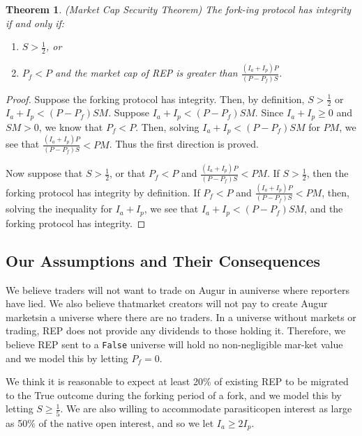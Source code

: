 \documentclass[12pt,floatfix,reprint,nofootinbib,amsmath,amssymb,epsfig,pre,floats,letterpaper,groupedaffiliation]{revtex4-1}
\newtheorem{theorem}{Theorem}
\theoremstyle{definition}
\theoremstyle{definition}
\begin{document}
\begin{theorem}\label{th:market_cap_security_theorem}
(Market Cap Security Theorem) The fork-\linebreak ing protocol has integrity if and only if:
\begin{enumerate}
\item $S > \frac{1}{2}$, or
\item $P_f < P$ and the market cap of REP is greater than $\frac{(I_a + I_p)P}{(P - P_f)S}$.
\end{enumerate}
\end{theorem}

\begin{proof}
Suppose the forking protocol has integrity. Then, by definition, $S > \frac{1}{2}$ or $I_a + I_p < (P - P_f)SM$. Suppose $I_a + I_p < (P - P_f)SM$. Since $I_a + I_p \geq 0$ and $SM > 0$, we know that $P_f < P$. Then, solving $I_a + I_p < (P - P_f)SM$ for $PM$, we see that $\frac{(I_a + I_p)P}{(P - P_f)S} < PM$. Thus the first direction is proved.

Now suppose that $S > \frac{1}{2}$, or that $P_f < P$ and $\frac{(I_a + I_p)P}{(P - P_f)S} < PM$. If $S > \frac{1}{2}$, then the forking protocol has integrity by definition. If $P_f < P$ and $\frac{(I_a + I_p)P}{(P - P_f)S} < PM$, then, solving the inequality for $I_a + I_p$, we see that $I_a + I_p < (P-P_f) SM$, and the forking protocol has integrity.
\end{proof}

\subsection{Our Assumptions and Their Consequences}

We believe traders will not want to trade on Augur in a\linebreak universe where reporters have lied. We also believe that\linebreak market creators will not pay to create Augur markets\linebreak in a universe where there are no traders. In a universe without markets or trading, REP does not provide any dividends to those holding it. Therefore, we believe REP sent to a \texttt{False} universe will hold no non-negligible mar-\linebreak ket value and we model this by letting $P_f = 0$.

We think it is reasonable to expect at least 20\% of existing REP to be migrated to the True outcome during the forking period of a fork, and we model this by letting $S \geq \frac{1}{5}$. We are also willing to accommodate parasitic\linebreak open interest as large as 50\% of the native open interest, and so we let $I_a \geq 2I_p$.
\end{document}
